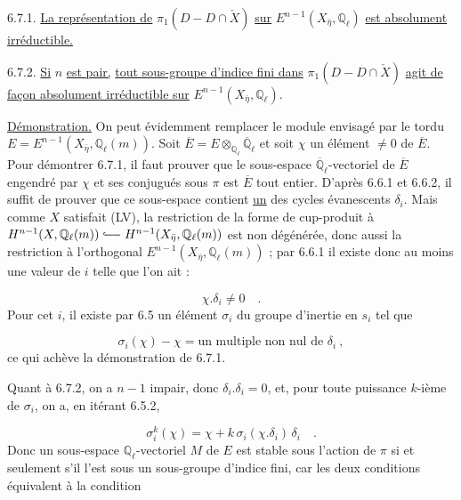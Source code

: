 6.7.1. \underline{La représentation de} $\pi_1(D - D \cap \check{X})$ \underline{sur} $E^{n-1}(X_{\bar{\eta}},\mathbb{Q}_\ell)$ \underline{est absolument irréductible.}

6.7.2. \underline{Si} $n$ \underline{est pair,} \underline{tout sous-groupe d'indice fini dans} $\pi_1(D - D \cap \check{X})$ \underline{agit de façon absolument irréductible sur} $E^{n-1}(X_{\bar{\eta}},\mathbb{Q}_\ell)$.

\underline{Démonstration.} On peut évidemment remplacer le module envisagé par le tordu $E = E^{n-1}(X_{\bar{\eta}},\mathbb{Q}_\ell(m))$. Soit $\overline{E} = E \otimes_{\mathbb{Q}_\ell} \overline{\mathbb{Q}}_\ell$ et soit $\chi$ un élément $\neq 0$ de $\overline{E}$. Pour démontrer 6.7.1, il faut prouver que le sous-espace $\overline{\mathbb{Q}}_\ell$-vectoriel de $\overline{E}$ engendré par $\chi$ et ses conjugués sous $\pi$ est $\overline{E}$ tout entier. D'après 6.6.1 et 6.6.2, il suffit de prouver que ce sous-espace contient \underline{un} des cycles évanescents $\delta_i$. Mais comme $X$ satisfait (LV), la restriction de la forme de cup-produit à $H^{n-1}(X,\mathbb{Q}_\ell(m)) \lhook\joinrel\relbar\joinrel\relbar H^{n-1}(X_{\bar{\eta}},\mathbb{Q}_\ell(m))$ est non dégénérée, donc aussi la restriction à l'orthogonal $E^{n-1}(X_{\bar{\eta}},\mathbb{Q}_\ell(m))$ ; par 6.6.1 il existe donc au moins une valeur de $i$ telle que l'on ait :

\begin{equation*}
\chi.\delta_i \neq 0 \quad .
\end{equation*}
Pour cet $i$, il existe par 6.5 un élément $\sigma_i$ du groupe d'inertie en $s_i$ tel que

\begin{equation}\tag{6.7.3}
\sigma_i(\chi) - \chi = \text{un multiple non nul de } \delta_i \ ,
\end{equation}
ce qui achève la démonstration de 6.7.1.



Quant à 6.7.2, on a $n-1$ impair, donc $\delta_i.\delta_i = 0$, et, pour toute puissance $k$-ième de $\sigma_i$, on a, en itérant 6.5.2,

\begin{equation}\tag{6.7.4}
\sigma_i^k(\chi) = \chi + k\,\sigma_i(\chi.\delta_i)\,\delta_i \quad .
\end{equation}
Donc un sous-espace $\mathbb{Q}_\ell$-vectoriel $M$ de $E$ est stable sous l'action de $\pi$ si et seulement s'il l'est sous un sous-groupe d'indice fini, car les deux conditions équivalent à la condition

